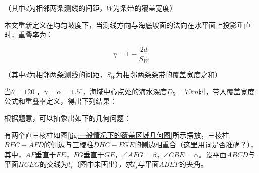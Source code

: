 （其中$d$为相邻两条测线的间距，$W$为条带的覆盖宽度）

本文重新定义在均匀坡度下，当测线方向与海底坡面的法向在水平面上投影垂直时，重叠率为：

\begin{equation}
    \eta = 1-\frac{2d}{S_W}
\end{equation}

（其中$d$为相邻两条测线的间距，$S_W$为相邻两条条带的覆盖宽度之和）

当$\theta = 120^\circ$，$\gamma=\alpha=1.5^\circ$，海域中心点处的海水深度$D_5 = 70m$时，带入覆盖宽度公式和重叠率定义，得出下列结果：

\begin{table}[h]
    \centering
    \caption{\textbf{问题1的计算结果(保留两位小数)}}
\end{table}


根据题意，可以抽象出如下的几何问题：

有两个直三棱柱如图\ref{fig:一般情况下的覆盖区域几何图}所示摆放，三棱柱$BEC-AFD$的侧边与三棱柱$DHC-FGE$的侧边相重合（这里用词是否准确？），其中，$AF$垂直于$FE$，$FG$垂直于$GE$，$\angle AFG=\beta$，$\angle CBE=\alpha$。设平面$ABCD$与平面$HCEG$的交线为$l_s$（图中未画出），求$l_s$与平面$ABEF$的夹角。

